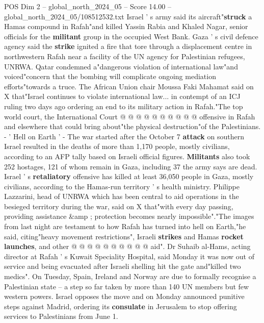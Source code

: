 \begin{textsample}{POS Dim 2 – global\_north\_2024\_05 – Score 14.00 – global\_north\_2024\_05/108512532.txt}
Israel ' s army said its aircraft"\textbf{struck} a Hamas compound in Rafah"and killed Yassin Rabia and Khaled Nagar, senior officials for the \textbf{militant} group in the occupied West Bank.
Gaza ' s civil defence agency said the \textbf{strike} ignited a fire that tore through a displacement centre in northwestern Rafah near a facility of the UN agency for Palestinian refugees, UNRWA.
Qatar condemned a"dangerous violation of international law"and voiced"concern that the bombing will complicate ongoing mediation efforts"towards a truce.
The African Union chair Moussa Faki Mahamat said on X that"Israel continues to violate international law... in contempt of an ICJ ruling two days ago ordering an end to its military action in Rafah."The top world court, the International Court @ @ @ @ @ @ @ @ @ @ offensive in Rafah and elsewhere that could bring about"the physical destruction"of the Palestinians. - ' Hell on Earth ' - The war started after the October 7 \textbf{attack} on southern Israel resulted in the deaths of more than 1,170 people, mostly civilians, according to an AFP tally based on Israeli official figures. \textbf{Militants} also took 252 hostages, 121 of whom remain in Gaza, including 37 the army says are dead.
Israel ' s \textbf{retaliatory} offensive has killed at least 36,050 people in Gaza, mostly civilians, according to the Hamas-run territory ' s health ministry.
Philippe Lazzarini, head of UNRWA which has been central to aid operations in the besieged territory during the war, said on X that"with every day passing, providing assistance \&amp ; protection becomes nearly impossible"."The images from last night are testament to how Rafah has turned into hell on Earth,"he said, citing"heavy movement restrictions", Israeli \textbf{strikes} and Hamas \textbf{rocket} \textbf{launches}, and other @ @ @ @ @ @ @ @ @ @ aid".
Dr Suhaib al-Hams, acting director at Rafah ' s Kuwait Speciality Hospital, said Monday it was now out of service and being evacuated after Israeli shelling hit the gate and"killed two medics".
On Tuesday, Spain, Ireland and Norway are due to formally recognise a Palestinian state -- a step so far taken by more than 140 UN members but few western powers.
Israel opposes the move and on Monday announced punitive steps against Madrid, ordering its \textbf{consulate} in Jerusalem to stop offering services to Palestinians from June 1.

\end{textsample}
